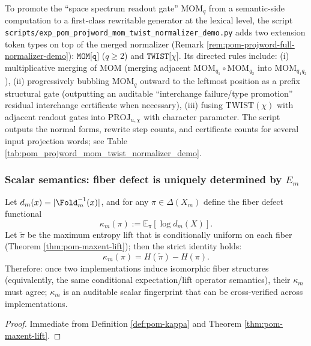\begin{remark}\label{rem:pom-projword-mom-twist-normalizer-demo}
To promote the ``space spectrum readout gate'' \(\mathrm{MOM}_q\) from a semantic-side computation to a first-class rewritable generator at the lexical level,
the script \texttt{scripts/exp\_pom\_projword\_mom\_twist\_normalizer\_demo.py} adds two extension token types on top of the merged normalizer (Remark \ref{rem:pom-projword-full-normalizer-demo}):
\(\texttt{MOM[q]}\) (\(q\ge 2\)) and \(\texttt{TWIST[}\chi\texttt{]}\).
Its directed rules include:
(i) multiplicative merging of \(\mathrm{MOM}\) (merging adjacent \(\mathrm{MOM}_{q_1}\circ\mathrm{MOM}_{q_2}\) into \(\mathrm{MOM}_{q_1q_2}\)),
(ii) progressively bubbling \(\mathrm{MOM}_q\) outward to the leftmost position as a prefix structural gate (outputting an auditable ``interchange failure/type promotion'' residual interchange certificate when necessary),
(iii) fusing \(\mathrm{TWIST}(\chi)\) with adjacent readout gates into \(\mathrm{PROJ}_{u,\chi}\) with character parameter.
The script outputs the normal forms, rewrite step counts, and certificate counts for several input projection words; see Table \ref{tab:pom_projword_mom_twist_normalizer_demo}.

\end{remark}

\subsubsection{Scalar semantics: fiber defect is uniquely determined by \texorpdfstring{$E_m$}{Em}}
\begin{corollary}\label{cor:pom-kappa-derivable}
Let \(d_m(x)=|\Fold_m^{-1}(x)|\), and for any \(\pi\in\Delta(X_m)\) define the fiber defect functional
$$
\kappa_m(\pi):=\mathbb{E}_{\pi}[\log d_m(X)].
$$
Let \(\widetilde\pi\) be the maximum entropy lift that is conditionally uniform on each fiber (Theorem \ref{thm:pom-maxent-lift}); then the strict identity holds:
$$
\kappa_m(\pi)=H(\widetilde\pi)-H(\pi).
$$
Therefore: once two implementations induce isomorphic fiber structures (equivalently, the same conditional expectation/lift operator semantics), their \(\kappa_m\) must agree; \(\kappa_m\) is an auditable scalar fingerprint that can be cross-verified across implementations.
\end{corollary}
\begin{proof}
Immediate from Definition \ref{def:pom-kappa} and Theorem \ref{thm:pom-maxent-lift}.
\end{proof}

